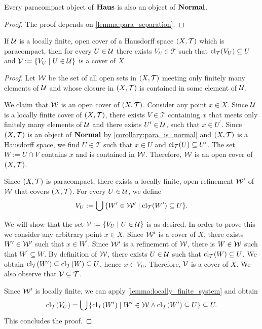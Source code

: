 \begin{corollary} \label{corollary:para_is_normal} \cite[p. 72]{Top}
	Every paracompact object of $\Haus$ is also an object of $\Normal$. 
\end{corollary}
\begin{proof}
	The proof depends on \ref{lemma:para_separation}.
\end{proof}

\begin{lemma} \label{lemma:special_cover}
	If $\cover$ is a locally finite, open cover of a Hausdorff space $\tspace$ which is paracompact, then for every $U \in \cover$ there exists $V_U \in \mathcal{T}$ such that $\cl{V_U} \subseteq U$ and $\cover[V] := \Bbraces{V_U \mid U \in \cover}$ is a cover of $X$.  
\end{lemma}
\begin{proof}
	Let $\cover[W]$ be the set of all open sets in $\tspace$ meeting only finitely many elements of $\cover$ and whose closure in $\tspace$ is contained in some element of $\cover$.
	
	We claim that $\cover[W]$ is an open cover of $\tspace$. Consider any point $x \in X$. Since $\cover$ is a locally finite cover of $\tspace$, there exists $V \in \mathcal{T}$ containing $x$ that meets only finitely many elements of $\cover$ and there exists $U^\prime \in \cover$, such that $x \in U^\prime$. Since $\tspace$ is an object of $\Normal$ by \ref{corollary:para_is_normal} and $\tspace$ is a Hausdorff space, we find $U \in \mathcal{T}$ such that $x \in U$ and $\cl{U} \subseteq U^\prime$. The set $W := U \cap V$ contains $x$ and is contained in $\cover[W]$. Therefore, $\cover[W]$ is an open cover of $\tspace$. 
	
	Since $\tspace$ is paracompact, there exists a locally finite, open refinement $\cover[W]^\prime$ of $\cover[W]$ that covers $\tspace$. For every $U \in \cover$, we define
	\begin{align*}
		V_U := \bigcup \Bbraces{W^\prime \in \cover[W]^\prime \mid \cl{W^\prime} \subseteq U}.
	\end{align*}
	
	We will show that the set $\cover[V] := \Bbraces{V_U \mid U \in \cover}$ is as desired. In order to prove this we consider any arbitrary point $x \in X$. Since $\cover[W]^\prime$ is a cover of $X$, there exists $W^\prime \in \cover[W]^\prime$ such that $x \in W^\prime$. Since $\cover[W]^\prime$ is a refinement of $\cover[W]$, there is $W \in \cover[W]$ such that $W^\prime \subseteq W$. By definition of $\cover[W]$, there exists $U \in \cover$ such that $\cl{W} \subseteq U$. We obtain $\cl{W^\prime} \subseteq \cl{W} \subseteq U$, hence $x \in V_U$. Therefore, $\cover[V]$ is a cover of $X$. We also observe that $\cover[V] \subseteq \mathcal{T}$. 
	
	Since $\cover[W]^\prime$ is locally finite, we can apply \ref{lemma:locally_finite_system} and obtain
	\begin{align*}
		\cl{V_U} = \bigcup \Bbraces{\cl{W^\prime} \mid W^\prime \in \cover[W] \land \cl{W^\prime} \subseteq U} \subseteq U.
	\end{align*}
	This concludes the proof.
\end{proof}

